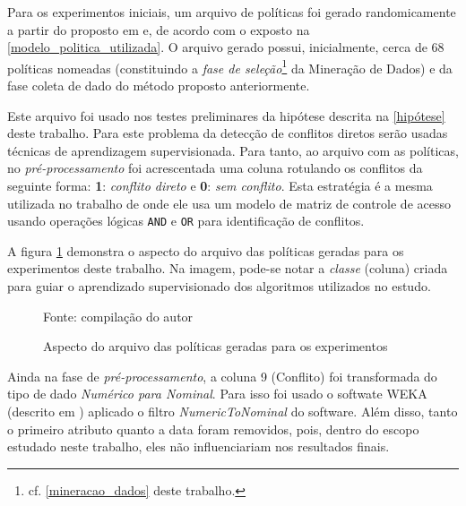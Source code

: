 Para os experimentos iniciais, um arquivo de políticas foi gerado randomicamente a partir do proposto em  e, de acordo com o exposto na \autoref{modelo_politica_utilizada}. O arquivo gerado possui, inicialmente, cerca de 68 políticas nomeadas (constituindo a \textit{fase de seleção}\footnote{cf. \autoref{mineracao_dados} deste trabalho.} da Mineração de Dados) e da fase coleta de dado do método proposto anteriormente. 

Este arquivo foi usado nos testes preliminares da hipótese descrita na \autoref{hipótese} deste trabalho. Para este problema da detecção de conflitos diretos serão usadas técnicas de aprendizagem supervisionada. Para tanto, ao arquivo com as políticas, no \textit{pré-processamento }foi acrescentada uma coluna rotulando os conflitos da seguinte forma: \textbf{1}: \textit{conflito direto} e \textbf{0}: \textit{sem conflito}. Esta estratégia é a mesma utilizada no trabalho de  onde ele usa um modelo de matriz de controle de acesso usando operações lógicas \texttt{AND} e \texttt{OR} para identificação de conflitos.

A figura \ref{fig:aspecto_arquivo} demonstra o aspecto do arquivo das políticas geradas para os experimentos deste trabalho. Na imagem, pode-se notar a \textit{classe} (coluna) criada para guiar o aprendizado supervisionado dos algoritmos utilizados no estudo.

\begin{figure}[h!]
	\centering
	\caption{Aspecto do arquivo das políticas geradas para os experimentos}
	
	\label{fig:aspecto_arquivo}
	{\scriptsize Fonte: compilação do autor}
\end{figure}

Ainda na fase de \textit{pré-processamento}, a coluna 9 (Conflito) foi transformada do tipo de dado \textit{Numérico para Nominal}. Para isso foi usado o softwate WEKA (descrito em ) aplicado o filtro \textit{NumericToNominal} do software. Além disso, tanto o primeiro atributo quanto a data foram removidos, pois, dentro do escopo estudado neste trabalho, eles não influenciariam nos resultados finais.

